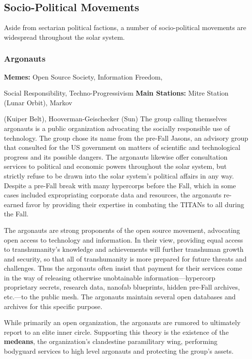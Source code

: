 \subsection{Socio-Political Movements}

Aside from sectarian political factions, a number of 
socio-political movements are widespread throughout 
the solar system.

\subsubsection{Argonauts}

\textbf{Memes:} Open Source Society, Information Freedom, 

Social Responsibility, Techno-Progressivism
\textbf{Main Stations:} Mitre Station (Lunar Orbit), Markov 

(Kuiper Belt), Hooverman-Geischecker (Sun)
The group calling themselves argonauts is a public 
organization advocating the socially responsible use 
of technology. The group chose its name from the 
pre-Fall Jasons, an advisory group that consulted 
for the US government on matters of scientific and 
technological progress and its possible dangers. The 
argonauts likewise offer consultation services to 
political and economic powers throughout the solar 
system, but strictly refuse to be drawn into the solar 
system's political affairs in any way. Despite a pre-Fall 
break with many hypercorps before the Fall, which in 
some cases included expropriating corporate data and 
resources, the argonauts re-earned favor by providing 
their expertise in combating the TITANs to all during 
the Fall.

The argonauts are strong proponents of the open 
source movement, advocating open access to technology
and information. In their view, providing equal
access to transhumanity's knowledge and achievements
will further transhuman growth and security,
so that all of transhumanity is more prepared for 
future threats and challenges. Thus the argonauts 
often insist that payment for their services come in 
the way of releasing otherwise unobtainable information—hypercorp
proprietary secrets, research data,
nanofab blueprints, hidden pre-Fall archives, etc.—to 
the public mesh. The argonauts maintain several open 
databases and archives for this specific purpose.

While primarily an open organization, the argonauts
are rumored to ultimately report to an elite
inner circle. Supporting this theory is the existence 
of the \textbf{medeans}, the organization's clandestine paramilitary
wing, performing bodyguard services to high
level argonauts and protecting the group's assets.

